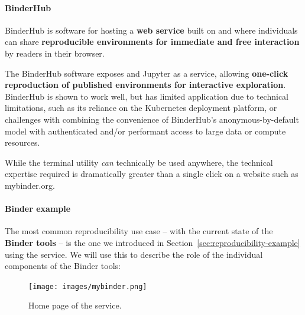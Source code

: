\paragraph{BinderHub}\label{sec:binderhub}
BinderHub is software for hosting a \textbf{web service} built on \repotodocker{} and
\JupyterHub{} where individuals can share \textbf{reproducible environments for
immediate and free interaction} by readers in their browser.

The BinderHub software exposes \repotodocker{} and Jupyter as a service,
allowing \textbf{one-click reproduction of published environments for interactive exploration}.
BinderHub is shown to work well,
but has limited application due to technical limitations,
such as its reliance on the Kubernetes deployment platform,
or challenges with combining the convenience of BinderHub's anonymous-by-default model
with authenticated and/or performant access to large data or compute resources.

While the \repotodocker{} terminal utility \emph{can} technically be used anywhere,
the technical expertise required is dramatically greater than a single click on a website such as mybinder.org.

\paragraph{Binder example}
\label{binder-how-does-it-work}

The most common reproducibility use case -- with the current state of the
\textbf{Binder tools} -- is the one we introduced in
Section~\ref{sec:reproducibility-example} using the \mybinder{} service. We will use this to
describe the role of the individual components of the Binder tools:

\begin{figure}[ht]
  \centering
    \texttt{[image: images/mybinder.png]}
    \caption{Home page of the \mybinder{} service.}
    \label{fig:mybinder-homepage}
\end{figure}

